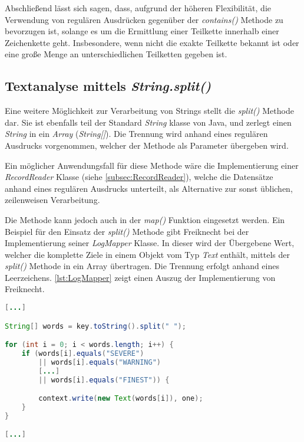 Abschließend lässt sich sagen, dass, aufgrund der höheren Flexibilität, die Verwendung von regulären Ausdrücken gegenüber der \textit{contains()} Methode zu bevorzugen ist, solange es um die Ermittlung einer Teilkette innerhalb einer Zeichenkette geht. Insbesondere, wenn nicht die exakte Teilkette bekannt ist oder eine große Menge an unterschiedlichen Teilketten gegeben ist.


\subsection{Textanalyse mittels \textit{String.split()}}
Eine weitere Möglichkeit zur Verarbeitung von Strings stellt die \textit{split()} Methode dar. Sie ist ebenfalls teil der Standard \textit{String} klasse von Java, und zerlegt einen \textit{String} in ein \textit{Array} (\textit{String[]}). Die Trennung wird anhand eines regulären Ausdrucks vorgenommen, welcher der Methode als Parameter übergeben wird.

Ein möglicher Anwendungsfall für diese Methode wäre die Implementierung einer \textit{RecordReader} Klasse (siehe \autoref{subsec:RecordReader}), welche die Datensätze anhand eines regulären Ausdrucks unterteilt, als Alternative zur sonst üblichen, zeilenweisen Verarbeitung.

Die Methode kann jedoch auch in der \textit{map()} Funktion eingesetzt werden. Ein Beispiel für den Einsatz der \textit{split()} Methode gibt Freiknecht bei der Implementierung seiner \textit{LogMapper} Klasse. In dieser wird der Übergebene Wert, welcher die komplette Ziele in einem Objekt vom Typ \textit{Text} enthält, mittels der \textit{split()} Methode in ein Array übertragen. Die Trennung erfolgt anhand eines Leerzeichens. \autoref{lst:LogMapper} zeigt einen Auszug der Implementierung von Freiknecht. \\

\begin{lstlisting}[language=Java,caption=Auszug der \textit{map()} Methode der Klasse \textit{LogMapper}, title=\autoref*{lst:LogMapper}: Auszug der \textit{map()} Methode der Klasse \textit{LogMapper}\protect\footnotemark,label=lst:LogMapper]
[...]

String[] words = key.toString().split(" ");

for (int i = 0; i < words.length; i++) {
	if (words[i].equals("SEVERE")
		|| words[i].equals("WARNING")
		[...]
		|| words[i].equals("FINEST")) {

		context.write(new Text(words[i]), one);
	}
}

[...]
\end{lstlisting}

